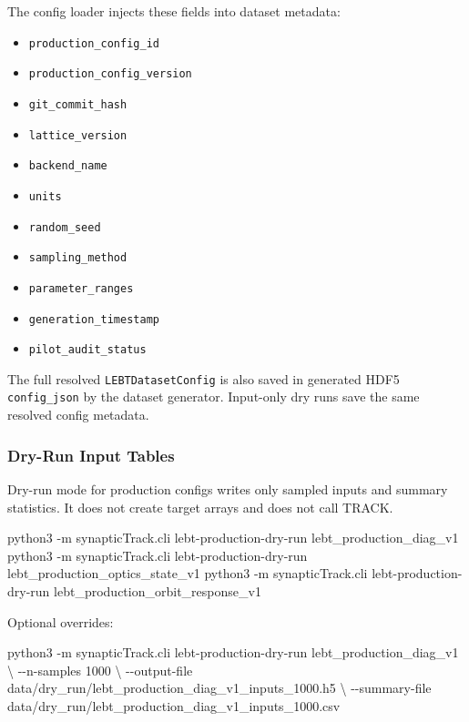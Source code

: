 \documentclass[
]{article}
\newenvironment{Shaded}{}{}
\newcommand{\AttributeTok}[1]{\textcolor[rgb]{0.49,0.56,0.16}{#1}}
\newcommand{\DataTypeTok}[1]{\textcolor[rgb]{0.56,0.13,0.00}{#1}}
\newcommand{\ExtensionTok}[1]{#1}
\newcommand{\NormalTok}[1]{#1}
\providecommand{\tightlist}{%
  \setlength{\itemsep}{0pt}\setlength{\parskip}{0pt}}
\begin{document}
The config loader injects these fields into dataset metadata:

\begin{itemize}
\tightlist
\item
  \texttt{production\_config\_id}
\item
  \texttt{production\_config\_version}
\item
  \texttt{git\_commit\_hash}
\item
  \texttt{lattice\_version}
\item
  \texttt{backend\_name}
\item
  \texttt{units}
\item
  \texttt{random\_seed}
\item
  \texttt{sampling\_method}
\item
  \texttt{parameter\_ranges}
\item
  \texttt{generation\_timestamp}
\item
  \texttt{pilot\_audit\_status}
\end{itemize}

The full resolved \texttt{LEBTDatasetConfig} is also saved in generated
HDF5 \texttt{config\_json} by the dataset generator. Input-only dry runs
save the same resolved config metadata.

\hypertarget{dry-run-input-tables}{%
\subsubsection{Dry-Run Input Tables}\label{dry-run-input-tables}}

Dry-run mode for production configs writes only sampled inputs and
summary statistics. It does not create target arrays and does not call
TRACK.

\begin{Shaded}
\begin{Highlighting}[]
\ExtensionTok{python3} \AttributeTok{{-}m}\NormalTok{ synapticTrack.cli lebt{-}production{-}dry{-}run lebt\_production\_diag\_v1}
\ExtensionTok{python3} \AttributeTok{{-}m}\NormalTok{ synapticTrack.cli lebt{-}production{-}dry{-}run lebt\_production\_optics\_state\_v1}
\ExtensionTok{python3} \AttributeTok{{-}m}\NormalTok{ synapticTrack.cli lebt{-}production{-}dry{-}run lebt\_production\_orbit\_response\_v1}
\end{Highlighting}
\end{Shaded}

Optional overrides:

\begin{Shaded}
\begin{Highlighting}[]
\ExtensionTok{python3} \AttributeTok{{-}m}\NormalTok{ synapticTrack.cli lebt{-}production{-}dry{-}run lebt\_production\_diag\_v1 }\DataTypeTok{\textbackslash{}}
  \AttributeTok{{-}{-}n{-}samples}\NormalTok{ 1000 }\DataTypeTok{\textbackslash{}}
  \AttributeTok{{-}{-}output{-}file}\NormalTok{ data/dry\_run/lebt\_production\_diag\_v1\_inputs\_1000.h5 }\DataTypeTok{\textbackslash{}}
  \AttributeTok{{-}{-}summary{-}file}\NormalTok{ data/dry\_run/lebt\_production\_diag\_v1\_inputs\_1000.csv}
\end{Highlighting}
\end{Shaded}
\end{document}
